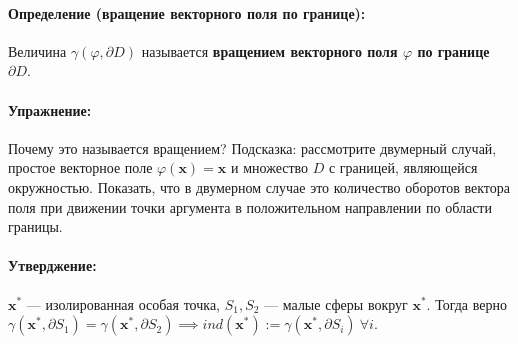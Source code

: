 \paragraph{Определение (вращение векторного поля по границе):} Величина $\gamma(\varphi, \partial D)$ называется \textbf{вращением векторного поля $\varphi$ по границе $\partial D$}.
\paragraph{Упражнение:} Почему это называется вращением? Подсказка: рассмотрите двумерный случай, простое векторное поле $\varphi(\mathbf{x}) = \mathbf{x}$ и множество $D$ с границей, являющейся окружностью. Показать, что в двумерном случае это количество оборотов вектора поля при движении точки аргумента в положительном направлении по области границы.
\paragraph{Утверджение:} $\mathbf{x^*}$ --- изолированная особая точка, $S_1, S_2$ --- малые сферы вокруг $\mathbf{x^*}$. Тогда верно $\gamma(\mathbf{x^*}, \partial S_1) = \gamma(\mathbf{x^*}, \partial S_2) \implies ind(\mathbf{x^*}) := \gamma(\mathbf{x^*}, \partial S_i) \ \forall i.$
